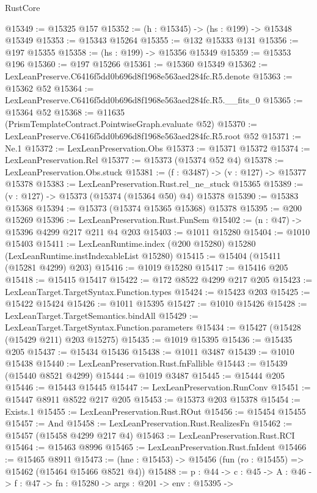 \begin{lexlean}{RustCore}
\begin{coremodule}
@15349 := @15325 @157
@15352 := (h : @15345) -> (hs : @199) -> @15348 @15349
@15353 := @15343 @15264
@15355 := @132 @15333 @131
@15356 := @197 @15355
@15358 := (hs : @199) -> @15356 @15349
@15359 := @15353 @196
@15360 := @197 @15266
@15361 := @15360 @15349
@15362 := LexLeanPreserve.C6416f5dd0b696d8f1968e563aed284fc.R5.denote
@15363 := @15362 @52
@15364 := LexLeanPreserve.C6416f5dd0b696d8f1968e563aed284fc.R5.__fits_0
@15365 := @15364 @52
@15368 := @11635 (PrismTemplateContract.PointwiseGraph.evaluate @52)
@15370 := LexLeanPreserve.C6416f5dd0b696d8f1968e563aed284fc.R5.root @52
@15371 := Ne.{1}
@15372 := LexLeanPreservation.Obs
@15373 := @15371 @15372
@15374 := LexLeanPreservation.Rel
@15377 := @15373 (@15374 @52 @4)
@15378 := LexLeanPreservation.Obs.stuck
@15381 := (f : @3487) -> (v : @127) -> @15377 @15378
@15383 := LexLeanPreservation.Rust.rel_ne_stuck @15365
@15389 := (v : @127) -> @15373 (@15374 (@15364 @50) @4) @15378
@15390 := @15383 @15368
@15394 := @15373 (@15374 @15365 @15368) @15378
@15395 := @200 @15269
@15396 := LexLeanPreservation.Rust.FunSem
@15402 := (n : @47) -> @15396 @4299 @217 @211 @4 @203
@15403 := @1011 @15280
@15404 := @1010 @15403
@15411 := LexLeanRuntime.index (@200 @15280) @15280 (LexLeanRuntime.instIndexableList @15280)
@15415 := @15404 (@15411 (@15281 @4299) @203)
@15416 := @1019 @15280
@15417 := @15416 @205
@15418 := @15415 @15417
@15422 := @172 @8522 @4299 @217 @205
@15423 := LexLeanTarget.TargetSyntax.Function.types
@15424 := @15423 @203
@15425 := @15422 @15424
@15426 := @1011 @15395
@15427 := @1010 @15426
@15428 := LexLeanTarget.TargetSemantics.bindAll
@15429 := LexLeanTarget.TargetSyntax.Function.parameters
@15434 := @15427 (@15428 (@15429 @211) @203 @15275)
@15435 := @1019 @15395
@15436 := @15435 @205
@15437 := @15434 @15436
@15438 := @1011 @3487
@15439 := @1010 @15438
@15440 := LexLeanPreservation.Rust.fnFallible
@15443 := @15439 (@15440 @8521 @4299)
@15444 := @1019 @3487
@15445 := @15444 @205
@15446 := @15443 @15445
@15447 := LexLeanPreservation.RunConv
@15451 := @15447 @8911 @8522 @217 @205
@15453 := @15373 @203 @15378
@15454 := Exists.{1}
@15455 := LexLeanPreservation.Rust.ROut
@15456 := @15454 @15455
@15457 := And
@15458 := LexLeanPreservation.Rust.RealizesFn
@15462 := @15457 (@15458 @4299 @217 @4)
@15463 := LexLeanPreservation.Rust.RCI
@15464 := @15463 @8996
@15465 := LexLeanPreservation.Rust.fnIdent
@15466 := @15465 @8911
@15473 := (hne : @15453) -> @15456 (fun (ro : @15455) => @15462 (@15464 @15466 @8521 @4))
@15488 := {p : @44} ->
  {c : @45} ->
  {A : @46} ->
  {f : @47} ->
  {fn : @15280} ->
  {args : @201} ->
  {env : @15395} ->

\end{coremodule}
\end{lexlean}
